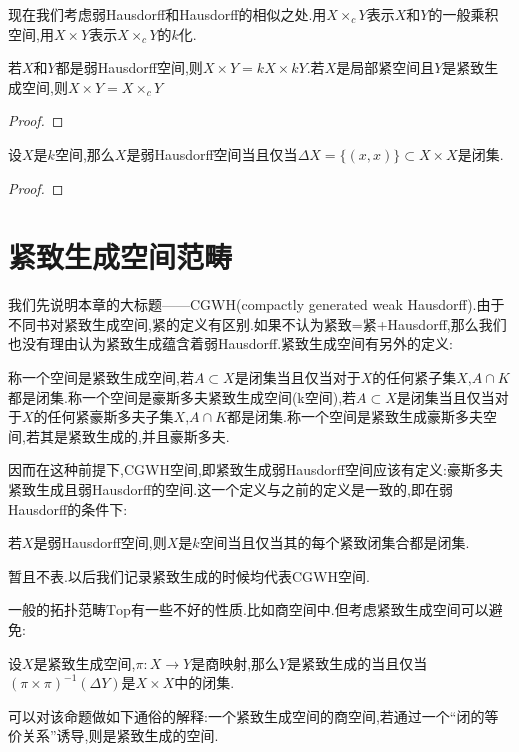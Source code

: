 现在我们考虑弱Hausdorff和Hausdorff的相似之处.用$X \times_c Y$表示$X$和$Y$的一般乘积空间,用$X \times Y$表示$X \times _c Y$的$k$化.
\begin{proposition}
    若$X$和$Y$都是弱Hausdorff空间,则$X \times Y=kX \times kY$.若$X$是局部紧空间且$Y$是紧致生成空间,则$X \times Y=X \times_c Y$
\end{proposition}
\begin{proof}
    
\end{proof}
\begin{lemma}
    设$X$是$k$空间,那么$X$是弱Hausdorff空间当且仅当$\Delta X=\{(x,x)\} \subset X \times X$是闭集.
\end{lemma}
\begin{proof}
    
\end{proof}
\section{紧致生成空间范畴}
我们先说明本章的大标题——CGWH(compactly generated weak Hausdorff).由于不同书对紧致生成空间,紧的定义有区别.如果不认为紧致=紧+Hausdorff,那么我们也没有理由认为紧致生成蕴含着弱Hausdorff.紧致生成空间有另外的定义:
\begin{definition}[不作为本笔记的一般定义]
    称一个空间是紧致生成空间,若$A\subset X$是闭集当且仅当对于$X$的任何紧子集$X$,$A\cap K$都是闭集.称一个空间是豪斯多夫紧致生成空间(k空间),若$A\subset X$是闭集当且仅当对于$X$的任何紧豪斯多夫子集$X$,$A\cap K$都是闭集.称一个空间是紧致生成豪斯多夫空间,若其是紧致生成的,并且豪斯多夫.
\end{definition}
因而在这种前提下,CGWH空间,即紧致生成弱Hausdorff空间应该有定义:豪斯多夫紧致生成且弱Hausdorff的空间.这一个定义与之前的定义是一致的,即在弱Hausdorff的条件下:
\begin{proposition}
    若$X$是弱Hausdorff空间,则$X$是$k$空间当且仅当其的每个紧致闭集合都是闭集.
\end{proposition}

暂且不表.以后我们记录紧致生成的时候均代表CGWH空间.

一般的拓扑范畴$\mathrm{Top}$有一些不好的性质.比如商空间中.但考虑紧致生成空间可以避免:
\begin{proposition}
    设$X$是紧致生成空间,$\pi:X \to Y$是商映射,那么$Y$是紧致生成的当且仅当$(\pi \times \pi)^{-1}(\Delta Y)$是$X \times X$中的闭集.
\end{proposition}
可以对该命题做如下通俗的解释:一个紧致生成空间的商空间,若通过一个“闭的等价关系”诱导,则是紧致生成的空间.

